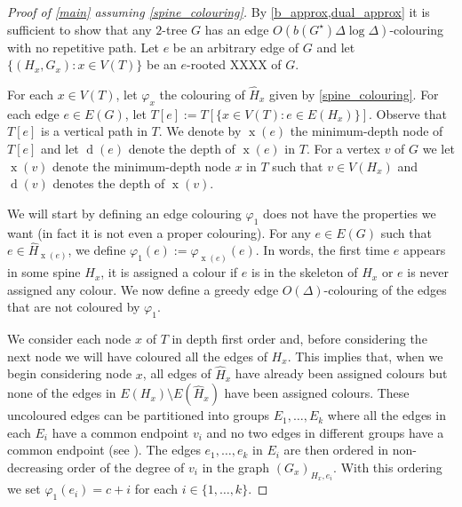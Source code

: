 \documentclass[kpfonts]{patmorin}
\DeclareMathOperator{\x}{x}
\DeclareMathOperator{\depth}{d}
\begin{document}
\begin{proof}[Proof of \cref{main} assuming \cref{spine_colouring}]
    By \cref{b_approx,dual_approx} it is sufficient to show that any $2$-tree $G$ has an edge $O(b(G^\star)\Delta\log\Delta)$-colouring with no repetitive path.  Let $e$ be an arbitrary edge of $G$ and let $\{(H_x,G_x): x\in V(T)\}$ be an $e$-rooted XXXX of $G$.

    For each $x\in V(T)$, let $\varphi_x$ the colouring of $\hat{H}_x$ given by \cref{spine_colouring}.  For each edge $e\in E(G)$, let $T[e]:=T[\{x\in V(T):e\in E(H_x)\}]$.  Observe that $T[e]$ is a vertical path in $T$.  We denote by $\x(e)$ the minimum-depth node of $T[e]$ and let $\depth(e)$ denote the depth of $\x(e)$ in $T$.  For a vertex $v$ of $G$ we let $\x(v)$ denote the minimum-depth node $x$ in $T$ such that $v\in V(H_x)$ and $\depth(v)$ denotes the depth of $\x(v)$.

    We will start by defining an edge colouring $\varphi_1$ does not have the properties we want (in fact it is not even a proper colouring).
    For any $e\in E(G)$ such that  $e\in \hat{H}_{\x(e)}$, we define
    $\varphi_1(e):=\varphi_{\x(e)}(e)$.  In words, the first time $e$ appears in some spine $H_x$, it is assigned a colour if $e$ is in the skeleton of $H_x$ or $e$ is never assigned any colour.  We now define a greedy edge $O(\Delta)$-colouring of the edges that are not coloured by $\varphi_1$.

    We consider each node $x$ of $T$ in depth first order and, before considering the next node we will have coloured all the edges of $H_x$.  This implies that, when we begin considering node $x$, all edges of $\hat{H}_x$ have already been assigned colours but none of the edges in  $E(H_x)\setminus E(\hat{H}_x)$ have been assigned colours.  These uncoloured edges can be partitioned into groups $E_1,\ldots,E_k$ where all the edges in each $E_i$ have a common endpoint $v_i$ and no two edges in different groups have a common endpoint (see ).  The edges $e_1,\ldots,e_k$ in $E_i$ are then ordered in non-decreasing order of the degree of $v_i$ in the graph $(G_x)_{H_x,e_i}$.  With this ordering we set $\varphi_1(e_i)=c+i$ for each $i\in\{1,\ldots,k\}$.


\end{proof}
\end{document}
